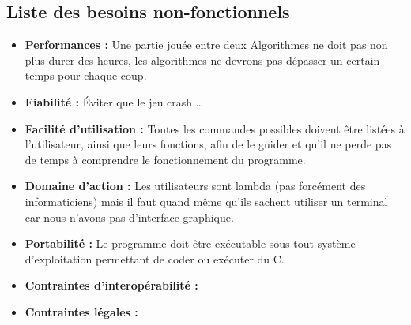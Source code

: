 \documentclass{article}
\begin{document}
\subsection{Liste des besoins non-fonctionnels}
\medskip
\begin{itemize}
    
    \item \textbf{Performances : }
    Une partie jouée entre deux Algorithmes ne doit pas non plus durer des heures, les algorithmes ne devrons pas dépasser un certain temps pour chaque coup.
    \newline
    \item \textbf{Fiabilité : }
    Éviter que le jeu crash \dots
    \newline
    \item \textbf{Facilité d'utilisation : } 
    Toutes les commandes possibles doivent être listées à l'utilisateur, ainsi que leurs fonctions, afin de le guider et qu'il ne perde pas de temps à comprendre le fonctionnement du programme.
    \newline
    \item \textbf{Domaine d'action : } 
    Les utilisateurs sont lambda (pas forcément des informaticiens) mais il faut quand même qu'ils sachent utiliser un terminal car nous n'avons pas d'interface graphique.
    \newline
    \item \textbf{Portabilité : } 
    \newline
    Le programme doit être exécutable sous tout système d'exploitation permettant de coder ou exécuter du C. 
    \newline
    \item \textbf{Contraintes d'interopérabilité : } 
    \newline
    \item \textbf{Contraintes légales : } 
\end{itemize}




\end{document}
